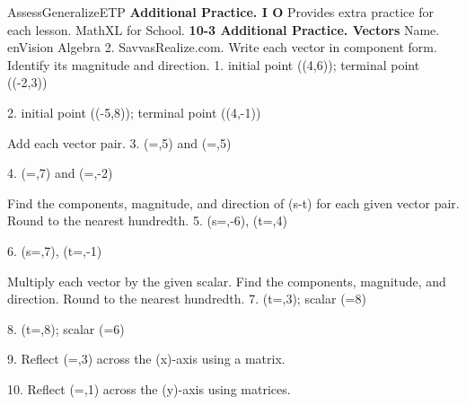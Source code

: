 \documentclass{article}
\newenvironment{te-addendum}[2]{}{}     %
\newcommand{\answer}[1]{}               %
\begin{document}
\begin{te-addendum}{Assess}{GeneralizeETP}
\textbf{Additional Practice. I O}
Provides extra practice for each lesson. MathXL for School.
\textbf{10-3 Additional Practice. Vectors}
Name. enVision Algebra 2. SavvasRealize.com.
Write each vector in component form. Identify its magnitude and direction.
1. initial point ((4,6)); terminal point ((-2,3))
\answer{(\langle-6,-3\rangle), about 6.7, about (206.6^\circ)}
2. initial point ((-5,8)); terminal point ((4,-1))
\answer{(\langle9,-9\rangle), about 12.7, (-45^\circ)}
Add each vector pair.
3. (=,5\rangle) and (=,5\rangle)
\answer{(\langle8,10\rangle)}
4. (=,7\rangle) and (=,-2\rangle)
\answer{(\langle-4,5\rangle)}
Find the components, magnitude, and direction of (\vec s-\vec t) for each given vector pair. Round to the nearest hundredth.
5. (\vec s=,-6\rangle), (\vec t=,4\rangle)
\answer{(\langle3,-10\rangle), 10.44, (-73.30^\circ)}
6. (\vec s=,7\rangle), (\vec t=,-1\rangle)
\answer{(\langle4,8\rangle), 8.94, (63.43^\circ)}
Multiply each vector by the given scalar. Find the components, magnitude, and direction. Round to the nearest hundredth.
7. (\vec t=,3\rangle); scalar (=8)
\answer{(\langle16,24\rangle), 28.84, (56.31^\circ)}
8. (\vec t=,8\rangle); scalar (=6)
\answer{(\langle-24,48\rangle), 53.67, (116.57^\circ)}
9. Reflect (=,3\rangle) across the (x)-axis using a matrix.
\answer{(T\cdot\vec{EF}=\begin{bmatrix}1&0\\0&-1\end{bmatrix}\begin{bmatrix}5\\3\end{bmatrix}=\begin{bmatrix}5+0\\0+(-3)\end{bmatrix}=\begin{bmatrix}5\\-3\end{bmatrix})}
10. Reflect (=,1\rangle) across the (y)-axis using matrices.
\answer{(T\cdot\vec{GH}=\begin{bmatrix}-1&0\\0&1\end{bmatrix}\begin{bmatrix}-2\\1\end{bmatrix}=\begin{bmatrix}2+0\\0+1\end{bmatrix}=\begin{bmatrix}2\\1\end{bmatrix})}

\end{te-addendum}
\end{document}
